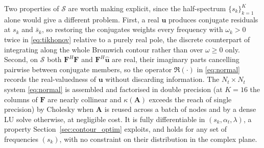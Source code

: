 ﻿\documentclass[a4paper,12pt]{article}
\theoremstyle{definition}
\theoremstyle{remark}
\begin{document}
Two properties of $\mathcal{S}$ are worth making explicit, since the half-spectrum $\{s_k\}_{k=1}^{K}$ alone would give a different problem. First, a real $\bm{u}$ produces conjugate residuals at $s_k$ and $\bar{s}_k$, so restoring the conjugates weights every frequency with $\omega_k > 0$ twice in \eqref{eq:tikhonov} relative to a purely real pole, the discrete counterpart of integrating along the whole Bromwich contour rather than over $\omega \ge 0$ only. Second, on $\mathcal{S}$ both $\bm{F}^H\bm{F}$ and $\bm{F}^H\hat{\bm{u}}$ are real, their imaginary parts cancelling pairwise between conjugate members, so the operator $\Re(\cdot)$ in \eqref{eq:normal} records the real-valuedness of $\bm{u}$ without discarding information. The $N_t \times N_t$ system \eqref{eq:normal} is assembled and factorised in double precision (at $K = 16$ the columns of $\bm{F}$ are nearly collinear and $\kappa(\bm{A})$ exceeds the reach of single precision) by Cholesky when $\bm{A}$ is reused across a batch of nodes and by a dense LU solve otherwise, at negligible cost. It is fully differentiable in $(s_k, \alpha_t, \lambda)$, a property Section~\ref{sec:contour_optim} exploits, and holds for any set of frequencies $(s_k)$, with no constraint on their distribution in the complex plane.
\end{document}
